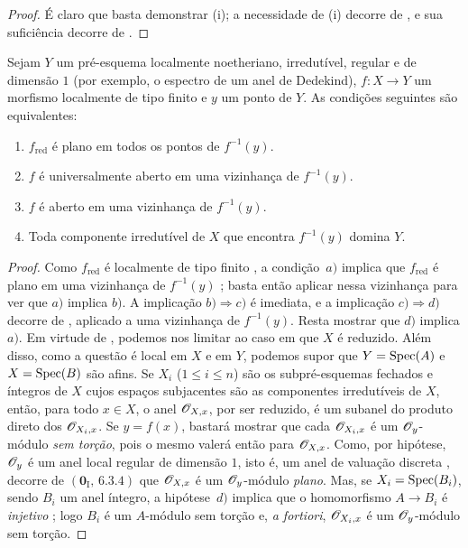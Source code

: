 \begin{proof}
É claro que basta demonstrar (i); a necessidade de (i) decorre de , e sua suficiência decorre de .
\end{proof}

\begin{proposition}[14.3.8]
\label{IV.14.3.8}
Sejam $Y$ um pré-esquema localmente noetheriano, irredutível, regular e de dimensão $1$ (por exemplo, o espectro de um anel de Dedekind), $f:X\to Y$ um morfismo localmente de tipo finito e $y$ um ponto de $Y$.
As condições seguintes são equivalentes:
\begin{enumerate}[label=\emph{\alph*)}]
  \item $f_{\mathrm{red}}$ é plano em todos os pontos de $f^{-1}(y)$.
  \item $f$ é universalmente aberto em uma vizinhança de $f^{-1}(y)$.
  \item $f$ é aberto em uma vizinhança de $f^{-1}(y)$.
  \item Toda componente irredutível de $X$ que encontra $f^{-1}(y)$ domina $Y$.
\end{enumerate}
\end{proposition}

\begin{proof}
Como $f_{\mathrm{red}}$ é localmente de tipo finito , a condição~$a)$ implica que $f_{\mathrm{red}}$ é plano em uma vizinhança de $f^{-1}(y)$ ; basta então aplicar  nessa vizinhança para ver que $a)$ implica $b)$.
A implicação $b)\Rightarrow c)$ é imediata, e a implicação $c)\Rightarrow d)$ decorre de , aplicado a uma vizinhança de $f^{-1}(y)$.
Resta mostrar que $d)$ implica $a)$.
Em virtude de , podemos nos limitar ao caso em que $X$ é reduzido.
Além disso, como a questão é local em $X$ e em $Y$, podemos supor que $Y=\operatorname{Spec}(A)$ e $X=\operatorname{Spec}(B)$
são afins.
Se $X_i$ ($1\leq i\leq n$) são os subpré-esquemas fechados e íntegros de $X$ cujos espaços subjacentes são as componentes irredutíveis de $X$, então, para todo $x\in X$, o anel $\mathscr{O}_{X,x}$, por ser reduzido, é um subanel do produto direto dos $\mathscr{O}_{X_i,x}$.
Se $y=f(x)$, bastará mostrar que cada $\mathscr{O}_{X_i,x}$ é um $\mathscr{O}_y$-módulo \emph{sem torção}, pois o mesmo valerá então para $\mathscr{O}_{X,x}$.
Como, por hipótese, $\mathscr{O}_y$ é um anel local regular de dimensão $1$, isto é, um anel de valuação discreta , decorre de $(\mathbf{0}_{\mathrm I},\,6.3.4)$ que $\mathscr{O}_{X,x}$ é um $\mathscr{O}_y$-módulo \emph{plano}.
Mas, se $X_i=\operatorname{Spec}(B_i)$, sendo $B_i$ um anel íntegro, a hipótese~$d)$ implica que o homomorfismo $A\to B_i$ é \emph{injetivo} ; logo $B_i$ é um $A$-módulo sem torção e, \emph{a fortiori}, $\mathscr{O}_{X_i,x}$ é um $\mathscr{O}_y$-módulo sem torção.
\end{proof}

